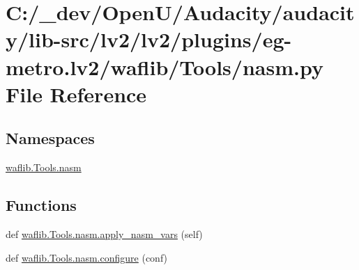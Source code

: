 \hypertarget{lv2_2plugins_2eg-metro_8lv2_2waflib_2_tools_2nasm_8py}{}\section{C\+:/\+\_\+dev/\+Open\+U/\+Audacity/audacity/lib-\/src/lv2/lv2/plugins/eg-\/metro.lv2/waflib/\+Tools/nasm.py File Reference}
\label{lv2_2plugins_2eg-metro_8lv2_2waflib_2_tools_2nasm_8py}
\subsection*{Namespaces}
\begin{DoxyCompactItemize}
\item 
 \hyperlink{namespacewaflib_1_1_tools_1_1nasm}{waflib.\+Tools.\+nasm}
\end{DoxyCompactItemize}
\subsection*{Functions}
\begin{DoxyCompactItemize}
\item 
def \hyperlink{namespacewaflib_1_1_tools_1_1nasm_a43879d6ce11e92cbb0978a352bf863ce}{waflib.\+Tools.\+nasm.\+apply\+\_\+nasm\+\_\+vars} (self)
\item 
def \hyperlink{namespacewaflib_1_1_tools_1_1nasm_aeea053be55b9909c496dfe1a4d62ce68}{waflib.\+Tools.\+nasm.\+configure} (conf)
\end{DoxyCompactItemize}
